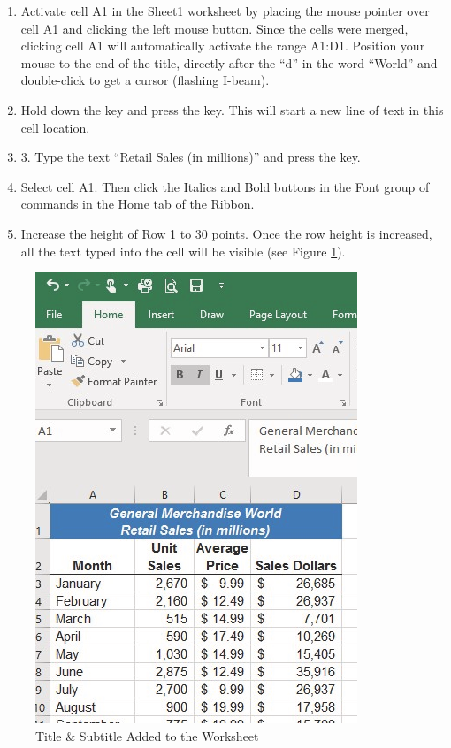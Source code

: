 \begin{enumerate}
	\item Activate cell \textsf{A1} in the Sheet1 worksheet by placing the mouse pointer over cell \textsf{A1} and clicking the left mouse button. Since the cells were merged, clicking cell \textsf{A1} will automatically activate the range \textsf{A1:D1}. Position your mouse to the end of the title, directly after the ``d'' in the word ``World'' and double-click to get a cursor (flashing I-beam).
	\item Hold down the  key and press the  key. This will start a new line of text in this cell location.
	\item 3. Type the text ``Retail Sales (in millions)'' and press the  key.
	\item Select cell \textsf{A1}. Then click the Italics and Bold buttons in the Font group of commands in the Home tab of the Ribbon.
	\item Increase the height of Row 1 to 30 points. Once the row height is increased, all the text typed into the cell will be visible (see Figure \ref{01:fig41}).

\end{enumerate}

\begin{figure}[H]
	\centering
	\includegraphics[width=\maxwidth{.95\linewidth}]{gfx/ch01_fig41}
	\caption{Title \& Subtitle Added to the Worksheet}
	\label{01:fig41}
\end{figure}


